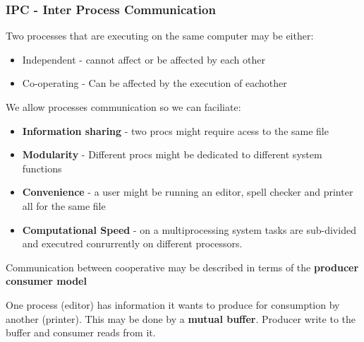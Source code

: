 \documentclass[a4paper, 10pt]{article}
\begin{document}
\subsubsection{IPC - Inter Process Communication}
\begin{definition}
    Two processes that are executing on the same computer may be either:
    \begin{itemize}
        \item Independent - cannot affect or be affected by each other
        \item Co-operating - Can be affected by the execution of eachother
    \end{itemize}
\end{definition}
We allow processes communication so we can faciliate:
\begin{itemize}
    \item \textbf{Information sharing} - two procs might require acess to the same file
    \item \textbf{Modularity} - Different procs might be dedicated to different system functions
    \item \textbf{Convenience} - a user might be running an editor, spell checker and printer all for the same file
    \item \textbf{Computational Speed} - on a multiprocessing system tasks are sub-divided and executred conrurrently on different processors.
\end{itemize}
Communication between cooperative may be described in terms of the \textbf{producer consumer model}

\begin{definitionbox}
    One process (editor) has information it wants to produce for consumption by another (printer). This may be done by a \textbf{mutual buffer}. Producer write to the buffer and consumer reads from it.
\end{definitionbox}
\end{document}
